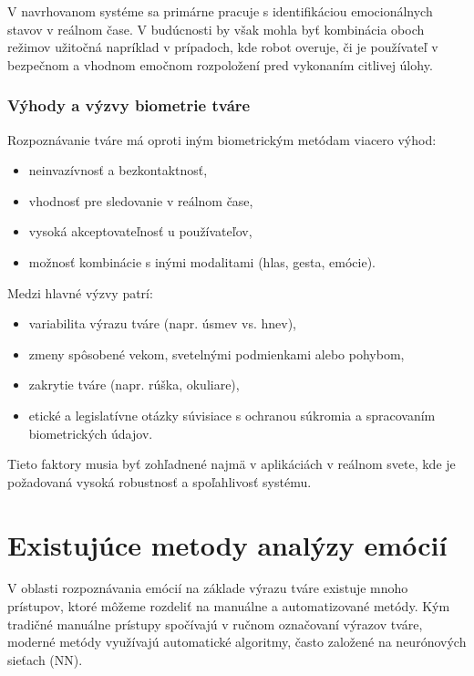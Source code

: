 V navrhovanom systéme sa primárne pracuje s identifikáciou emocionálnych stavov v reálnom čase. V budúcnosti by však mohla byť kombinácia oboch režimov užitočná napríklad v prípadoch, kde robot overuje, či je používateľ v bezpečnom a vhodnom emočnom rozpoložení pred vykonaním citlivej úlohy.
\subsubsection{Výhody a výzvy biometrie tváre}

Rozpoznávanie tváre má oproti iným biometrickým metódam viacero výhod:

\begin{itemize}
    \item neinvazívnosť a bezkontaktnosť,
    \item vhodnosť pre sledovanie v reálnom čase,
    \item vysoká akceptovateľnosť u používateľov,
    \item možnosť kombinácie s inými modalitami (hlas, gesta, emócie).
\end{itemize}

Medzi hlavné výzvy patrí:

\begin{itemize}
    \item variabilita výrazu tváre (napr. úsmev vs. hnev),
    \item zmeny spôsobené vekom, svetelnými podmienkami alebo pohybom,
    \item zakrytie tváre (napr. rúška, okuliare),
    \item etické a legislatívne otázky súvisiace s ochranou súkromia a spracovaním biometrických údajov.
\end{itemize}

Tieto faktory musia byť zohľadnené najmä v aplikáciách v reálnom svete, kde je požadovaná vysoká robustnosť a spoľahlivosť systému.

\section{Existujúce metody analýzy emócií}
\label{sec:existing_methods}
V oblasti rozpoznávania emócií na základe výrazu tváre existuje mnoho prístupov, ktoré môžeme rozdeliť na manuálne a automatizované metódy. Kým tradičné manuálne prístupy spočívajú v ručnom označovaní 
výrazov tváre, moderné metódy využívajú automatické algoritmy, často založené na neurónových sieťach (NN).

